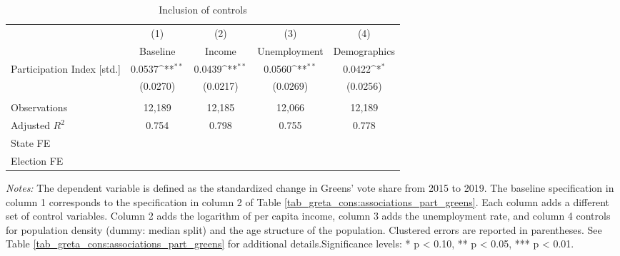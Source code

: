 \begin{table}[H]\centering
	\begin{threeparttable}
		\caption{Inclusion of controls}\label{tab_greta_cons:inclusion_controls}
		{\def\sym#1{\ifmmode^{#1}\else\(^{#1}\)\fi} 
			\begin{tabular}{l*{4}{c}}
				\toprule
				&\multicolumn{1}{c}{(1)}&\multicolumn{1}{c}{(2)}&\multicolumn{1}{c}{(3)}&\multicolumn{1}{c}{(4)}\\
				& Baseline & Income & Unemployment &  Demographics \\
				\midrule
			  Participation Index [std.]&      0.0537\sym{**} &      0.0439\sym{**} &      0.0560\sym{**} &      0.0422\sym{*}  \\
										&    (0.0270)         	&    (0.0217)         &    (0.0269)         &    (0.0256)         \\
				\\
				Observations        	&      12,189         &      12,185         &      12,066         &      12,189         \\
				Adjusted $R^2$         	&       0.754         &       0.798         &       0.755         &       0.778         \\			
				State FE				& \checkmark 		  & \checkmark       & \checkmark 	& \checkmark \\
				Election FE				& \checkmark 		  & \checkmark       & \checkmark   & \checkmark \\
				\bottomrule
		\end{tabular}}
		\begin{tablenotes} 
			\item \scriptsize \emph{Notes:} The dependent variable is defined as the standardized change in Greens' vote share from 2015 to 2019. The baseline specification in column 1 corresponds to the specification in column 2 of Table \ref{tab_greta_cons:associations_part_greens}. Each column adds a different set of control variables. Column 2 adds the logarithm of per capita income, column 3 adds the unemployment rate, and column 4 controls for population density (dummy: median split) and the age structure of the population. Clustered errors are reported in parentheses. See Table \ref{tab_greta_cons:associations_part_greens} for additional details.\newline Significance levels: * p < 0.10, ** p < 0.05, *** p < 0.01.
		\end{tablenotes} 
	\end{threeparttable}
\end{table}




